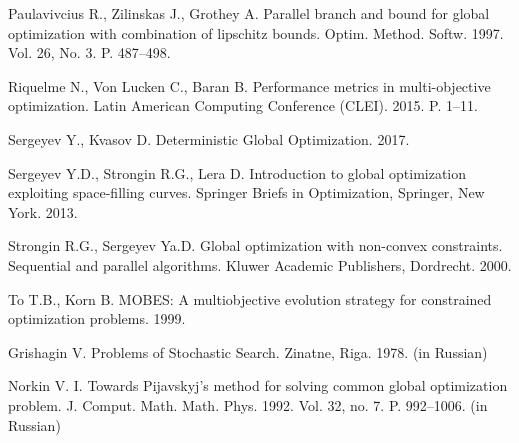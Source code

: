 \documentclass{cmi}
\begin{document}
\begin{biblio_lat}
{Paulavivcius R., Zilinskas J., Grothey A.}
\newblock Parallel branch and bound for global optimization with combination of
  lipschitz bounds.
\newblock Optim. Method. Softw. 1997. Vol. 26, No. 3. P. 487--498.
\newblock {}

{Riquelme} N., {Von Lucken} C., {Baran} B.
\newblock Performance metrics in multi-objective optimization.
 Latin American Computing Conference (CLEI). 2015. P. 1--11.
\newblock {}

Sergeyev Y., Kvasov D. Deterministic Global Optimization. 2017.
\newblock {}

{Sergeyev Y.D., Strongin R.G., Lera D.} Introduction to global optimization
  exploiting space-filling curves.
\newblock Springer Briefs in Optimization, Springer, New York. 2013.
\newblock {}

{Strongin R.G., Sergeyev Ya.D.} Global optimization with non-convex
  constraints. Sequential and parallel algorithms.
\newblock Kluwer Academic Publishers, Dordrecht. 2000.
\newblock {}

To T.B., Korn B.
\newblock MOBES: A multiobjective evolution strategy for constrained
  optimization problems. 1999.

{Grishagin V.}
\newblock Problems of Stochastic Search. Zinatne, Riga. 1978. (in Russian)

{Norkin V. I.}
\newblock Towards Pijavskyj's method for solving common global optimization problem.
\newblock J. Comput. Math. Math. Phys. 1992. Vol. 32, no. 7. P. 992--1006. (in Russian)

\end{biblio_lat}
\end{document}
